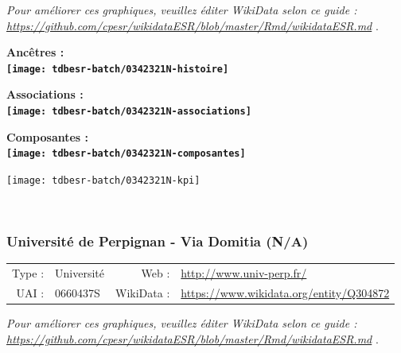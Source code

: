 \documentclass[12pt,french,]{article}
\begin{document}
\textit{\scriptsize Pour améliorer ces graphiques, veuillez éditer WikiData selon ce guide :  \href{https://github.com/cpesr/wikidataESR/blob/master/Rmd/wikidataESR.md}{https://github.com/cpesr/wikidataESR/blob/master/Rmd/wikidataESR.md}}
.

\vspace{1cm}  
\begin{minipage}[b]{0.50\textwidth}\begin{center} \bf Ancêtres : \\  
\texttt{[image: tdbesr-batch/0342321N-histoire]} \end{center}\end{minipage}\begin{minipage}[b]{0.50\textwidth}\begin{center} \bf Associations : \\  
\texttt{[image: tdbesr-batch/0342321N-associations]} \end{center}\end{minipage}

\hrulefill

\begin{center} \bf Composantes : \\  
\texttt{[image: tdbesr-batch/0342321N-composantes]} \end{center}

\begin{center}\texttt{[image: tdbesr-batch/0342321N-kpi]} \end{center}\checkoddpage

\ifoddpage \fi ~\newpage  

\hypertarget{universituxe9-de-perpignan---via-domitia-na}{%
\subsubsection{Université de Perpignan - Via Domitia
(N/A)}\label{universituxe9-de-perpignan---via-domitia-na}}

\begin{tabular*}{\textwidth}{rp{5cm}rl}  
\hline  
Type : & Université & Web : &\href{http://www.univ-perp.fr/}{http://www.univ-perp.fr/} \\  
UAI : & 0660437S & WikiData : & \href{https://www.wikidata.org/entity/Q304872}{https://www.wikidata.org/entity/Q304872} \\  
\hline  
\end{tabular*}

\textit{\scriptsize Pour améliorer ces graphiques, veuillez éditer WikiData selon ce guide :  \href{https://github.com/cpesr/wikidataESR/blob/master/Rmd/wikidataESR.md}{https://github.com/cpesr/wikidataESR/blob/master/Rmd/wikidataESR.md}}
.
\end{document}
